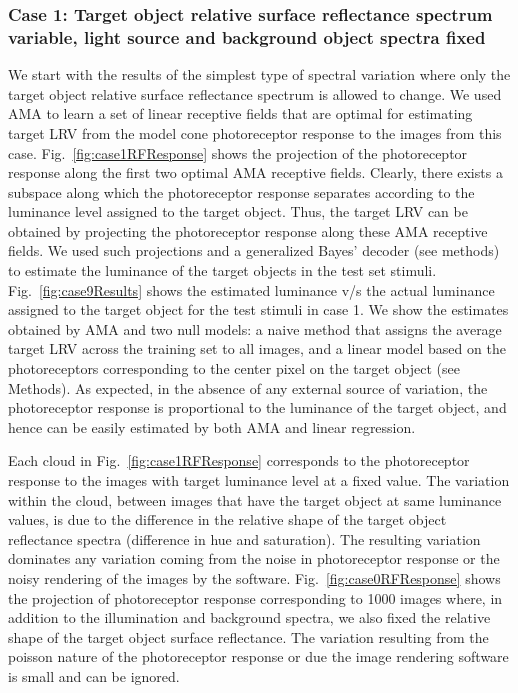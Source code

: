 \documentclass{jov}
\begin{document}
\subsubsection{Case 1: Target object relative surface reflectance spectrum variable, light source and background object spectra fixed}
We start with the results of the simplest type of spectral variation where only the target object relative surface reflectance spectrum is allowed to change. 
We used AMA to learn a set of linear receptive fields that are optimal for estimating target LRV from the model cone photoreceptor response to the images from this case.
Fig.~\ref{fig:case1RFResponse} shows the projection of the photoreceptor response along the first two optimal AMA receptive fields. 
Clearly, there exists a subspace along which the photoreceptor response separates according to the luminance level assigned to the target object. 
Thus, the target LRV can be obtained by projecting the photoreceptor response along these AMA receptive fields. 
We used such projections and a generalized Bayes' decoder (see methods) to estimate the luminance of the target objects in the test set stimuli. 
Fig.~\ref{fig:case9Results} shows the estimated luminance v/s the actual luminance assigned to the target object for the test stimuli in case 1. 
We show the estimates obtained by AMA and two null models: a naive method that assigns the average target LRV across the training set to all images, and a linear model based on the photoreceptors corresponding to the center pixel on the target object (see Methods). 
As expected, in the absence of any external source of variation, the photoreceptor response is proportional to the luminance of the target object, and hence can be easily estimated by both AMA and linear regression.

Each cloud in Fig.~\ref{fig:case1RFResponse} corresponds to the photoreceptor response to the images with target luminance level at a fixed value. 
The variation within the cloud, between images that have the target object at same luminance values, is due to the difference in the relative shape of the target object reflectance spectra (difference in hue and saturation). 
The resulting variation dominates any variation coming from the noise in photoreceptor response or the noisy rendering of the images by the software.
Fig.~\ref{fig:case0RFResponse} shows the projection of photoreceptor response corresponding to 1000 images where, in addition to the illumination and background spectra, we also fixed the relative shape of the target object surface reflectance. 
The variation resulting from the poisson nature of the photoreceptor response or due the image rendering software is small and can be ignored.
\end{document}
